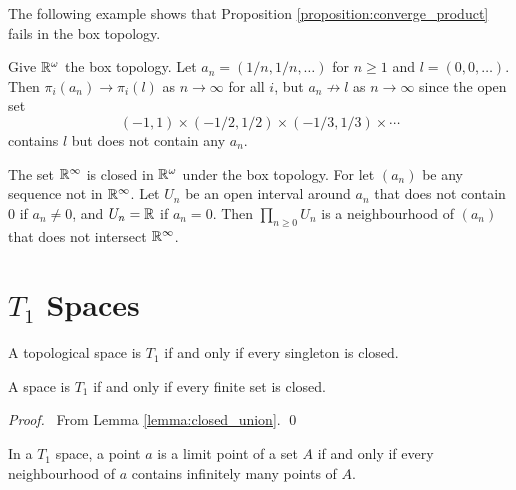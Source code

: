 The following example shows that Proposition \ref{proposition:converge_product} fails in the box topology.

\begin{example}
    Give $\mathbb{R}^\omega$ the box topology. Let $a_n = (1/n, 1/n, \ldots)$ for $n \geq 1$ and $l = (0, 0, \ldots)$. Then $\pi_i(a_n) \rightarrow \pi_i(l)$
    as $n \rightarrow \infty$ for all $i$, but $a_n \not\rightarrow l$ as $n \rightarrow \infty$ since the open set
    \[ (-1,1) \times (-1/2, 1/2) \times (-1/3,1/3) \times \cdots \]
    contains $l$ but does not contain any $a_n$.
\end{example}

\begin{example}
    The set $\mathbb{R}^\infty$ is closed in $\mathbb{R}^\omega$ under the box topology. For let $(a_n)$ be any sequence not in $\mathbb{R}^\infty$.
    Let $U_n$ be an open interval around $a_n$ that does not contain $0$ if $a_n \neq 0$, and $U_n = \mathbb{R}$ if $a_n = 0$.
    Then $\prod_{n \geq 0} U_n$ is a neighbourhood of $(a_n)$ that does not intersect $\mathbb{R}^\infty$.
\end{example}

\section{$T_1$ Spaces}

\begin{definition}[$T_1$ Space]
    A topological space is $T_1$ if and only if every singleton is closed.
\end{definition}

\begin{lemma}
    A space is $T_1$ if and only if every finite set is closed.
\end{lemma}

\begin{proof}
    \pf\ From Lemma \ref{lemma:closed_union}. \qed
\end{proof}

\begin{theorem}
    \label{theorem:limit_point_T1}
    In a $T_1$ space, a point $a$ is a limit point of a set $A$ if and only if every neighbourhood of $a$
    contains infinitely many points of $A$.
\end{theorem}

